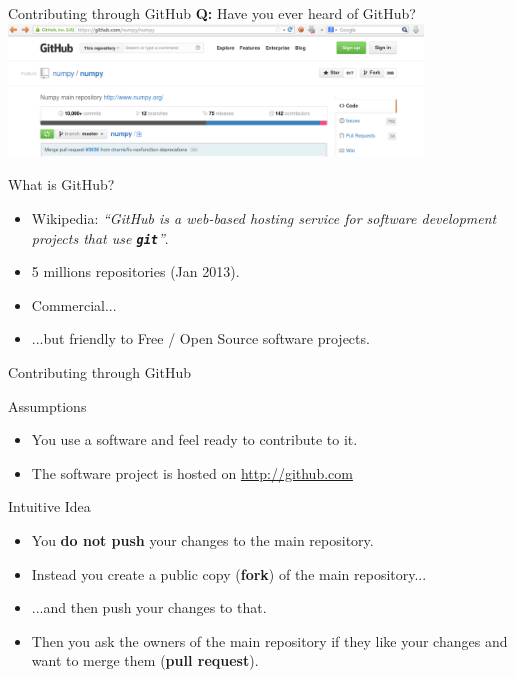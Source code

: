 \documentclass{beamer}
\newcommand{\git}{\texttt{\textbf{git}}\xspace}
\begin{document}
\begin{frame}{Contributing through GitHub}
  \textbf{Q:} Have you ever heard of GitHub?
  \includegraphics[width=11cm]{UniBo.IDSEPC.A2022.LavoroCondiviso/github}
  \begin{block}{What is GitHub?}
    \begin{itemize}
    \item Wikipedia: \emph{``GitHub is a web-based hosting service for
        software development projects that use \git''}.
    \item 5 millions repositories (Jan 2013).
    \item Commercial...
    \item ...but friendly to Free / Open Source software projects.
    \end{itemize}
  \end{block}
\end{frame}

\begin{frame}{Contributing through GitHub}
  \begin{block}{Assumptions}
    \begin{itemize}
    \item You use a software and feel ready to contribute to it.
    \item The software project is hosted on \url{http://github.com}
    \end{itemize}
  \end{block}
  \begin{block}{Intuitive Idea}
    \begin{itemize}
    \item You \textbf{do not push} your changes to the main
      repository.
    \item Instead you create a public copy (\textbf{fork}) of the main
      repository...
    \item ...and then push your changes to that.
    \item Then you ask the owners of the main repository if they like
      your changes and want to merge them (\textbf{pull request}).
    \end{itemize}
  \end{block}
\end{frame}
\end{document}
